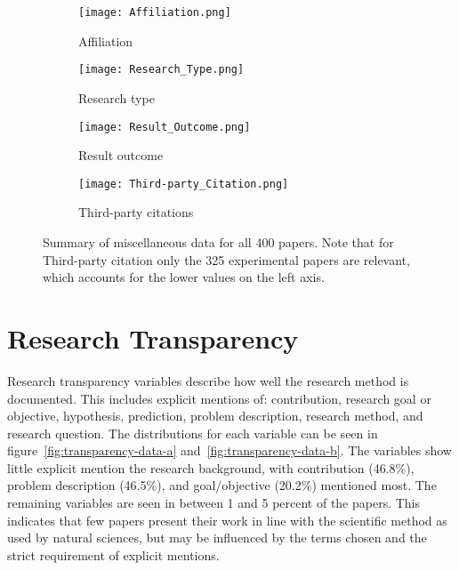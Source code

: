 \begin{figure}[!h]
\begin{center}
    \begin{subfigure}[b]{0.45\textwidth}
        \texttt{[image: Affiliation.png]}
        \caption{Affiliation}
        \label{fig:affiliation}
    \end{subfigure}
    \begin{subfigure}[b]{0.45\textwidth}
        \texttt{[image: Research\_Type.png]}
        \caption{Research type}
        \label{fig:research_type}
    \end{subfigure}
    \begin{subfigure}[b]{0.45\textwidth}
        \texttt{[image: Result\_Outcome.png]}
        \caption{Result outcome}
        \label{fig:result_outcome}
    \end{subfigure}
    \begin{subfigure}[b]{0.45\textwidth}
        \texttt{[image: Third-party\_Citation.png]}
        \caption{Third-party citations}
        \label{fig:third-party_citation}
    \end{subfigure}
    \caption[Summary of miscellaneous data.]{Summary of miscellaneous data for all 400 papers. Note that for Third-party citation only the 325 experimental papers are relevant, which accounts for the lower values on the left axis.}
    \label{fig:miscellaneous-data}
\end{center}
\end{figure}
\clearpage

\section{Research Transparency}
Research transparency variables describe how well the research method is documented. This includes explicit mentions of: contribution, research goal or objective, hypothesis, prediction, problem description, research method, and research question. The distributions for each variable can be seen in figure~\ref{fig:transparency-data-a} and~\ref{fig:transparency-data-b}. The variables show little explicit mention the research background, with contribution (46.8\%), problem description (46.5\%), and goal/objective (20.2\%) mentioned most. The remaining variables are seen in between 1 and 5 percent of the papers. This indicates that few papers present their work in line with the scientific method as used by natural sciences, but may be influenced by the terms chosen and the strict requirement of explicit mentions.

